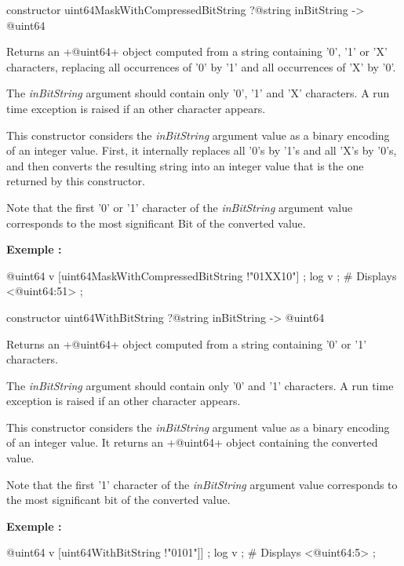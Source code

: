 
\begin{galgas}
constructor uint64MaskWithCompressedBitString ?@string inBitString -> @uint64
\end{galgas}


Returns an \ggs+@uint64+ object computed from a string containing '0', '1' or 'X' characters, replacing all occurrences of '0' by '1' and all occurrences of 'X' by '0'.

The \emph{inBitString} argument should contain only '0', '1' and 'X' characters. A run time exception is raised if an other character appears.

This constructor considers the \emph{inBitString} argument value as a binary encoding of an integer value. First, it internally replaces all '0's by '1's and all 'X's by '0's, and then converts the resulting string into an integer value that is the one returned by this constructor.

Note that the first '0' or '1' character of the \emph{inBitString} argument value corresponds to the most significant Bit of the converted value.

\textbf{Exemple :}
\begin{galgas}
@uint64 v [uint64MaskWithCompressedBitString !"01XX10"] ;
log v ; # Displays <@uint64:51> ;
\end{galgas}




\begin{galgas}
constructor uint64WithBitString ?@string inBitString -> @uint64
\end{galgas}


Returns an \ggs+@uint64+ object computed from a string containing '0' or '1' characters.

The \emph{inBitString} argument should contain only '0' and '1' characters. A run time exception is raised if an other character appears.

This constructor considers the \emph{inBitString} argument value as a binary encoding of an integer value. It returns an \ggs+@uint64+ object containing the converted value.

Note that the first '1' character of the \emph{inBitString} argument value corresponds to the most significant bit of the converted value.

\textbf{Exemple :}
\begin{galgas}
@uint64 v [uint64WithBitString !"0101"]] ;
log v ; # Displays <@uint64:5> ;
\end{galgas}


